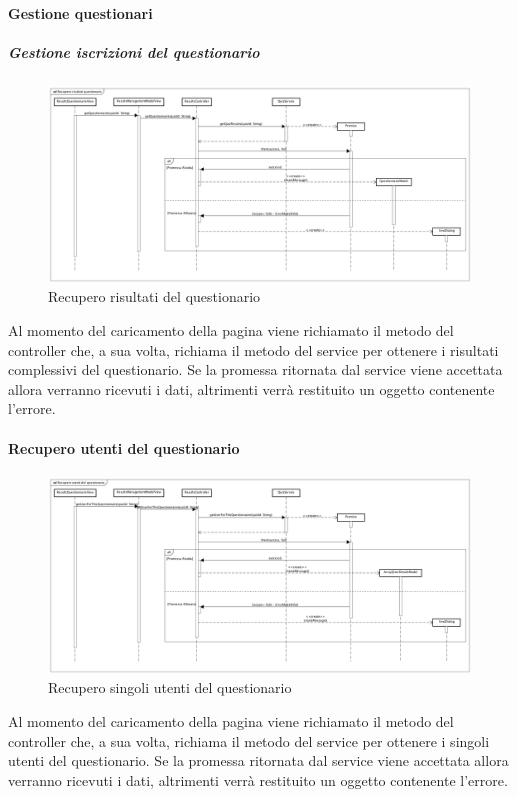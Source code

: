 \paragraph{Gestione questionari}

\subparagraph{Gestione iscrizioni del questionario}
\label{Recupero risultati del questionario}
\begin{figure}[ht]
	\centering
	\includegraphics[scale=0.25,keepaspectratio]{UML/DiagrammiDiSequenza/Front-end/ResultsManagement.png}
	\caption{Recupero risultati del questionario}
\end{figure} \FloatBarrier
 
Al momento del caricamento della pagina viene richiamato il metodo del controller che, a sua volta, richiama il metodo del service per ottenere i risultati complessivi del questionario. Se la promessa ritornata dal service viene accettata allora verranno ricevuti i dati, altrimenti verrà restituito un oggetto contenente l'errore.


\paragraph{Recupero utenti del questionario}
\label{Recupero utenti del questionario}
\begin{figure}[ht]
	\centering
	\includegraphics[scale=0.25,keepaspectratio]{UML/DiagrammiDiSequenza/Front-end/GetUsersForQuestionnaire.png}
	\caption{Recupero singoli utenti del questionario}
\end{figure} \FloatBarrier

Al momento del caricamento della pagina viene richiamato il metodo del controller che, a sua volta, richiama il metodo del service per ottenere i singoli utenti del questionario. Se la promessa ritornata dal service viene accettata allora verranno ricevuti i dati, altrimenti verrà restituito un oggetto contenente l'errore.

